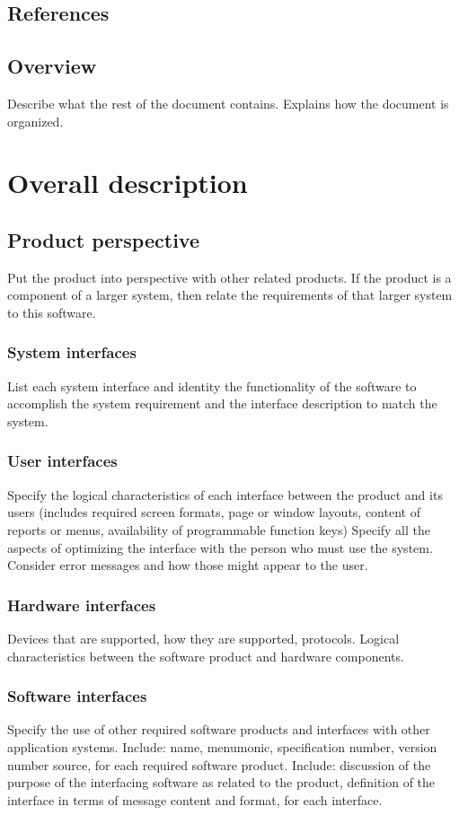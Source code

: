 \documentclass[letterpaper,10pt,draftclsnofoot,onecolumn,titlepage]{IEEEtran}
\begin{document}
	\subsection{References}
	
	\subsection{Overview}
	Describe what the rest of the document contains. 
	Explains how the document is organized. 
	
	\section{Overall description}
	\subsection{Product perspective}
	Put the product into perspective with other related products. 
	If the product is a component of a larger system, then relate the requirements of that larger system to this software.
	
	\subsubsection{System interfaces}
	List each system interface and identity the functionality of the software to accomplish the system requirement and the interface description to match the system.
	
	\subsubsection{User interfaces}
	Specify the logical characteristics of each interface between the product and its users (includes required screen formats, page or window layouts, content of reports or menus, availability of programmable function keys)
	Specify all the aspects of optimizing the interface with the person who must use the system. 
	Consider error messages and how those might appear to the user.
	
	\subsubsection{Hardware interfaces}
	Devices that are supported, how they are supported, protocols. 
	Logical characteristics between the software product and hardware components.
	
	\subsubsection{Software interfaces}
	Specify the use of other required software products and interfaces with other application systems.
	Include: name, menumonic, specification number, version number source, for each required software product. 
	Include: discussion of the purpose of the interfacing software as related to the product, definition of the interface in terms of message content and format, for each interface.
	
\end{document}
